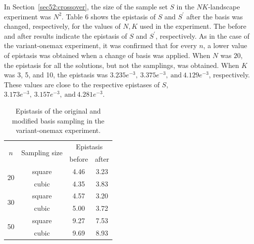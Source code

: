 In Section~\ref{sec52:crossover}, the size of the sample set $ S $ in the $ NK $-landscape experiment was $ N^2 $. Table 6 shows the epistasis of $ S $ and $ S^\prime $ after the basis was changed, respectively, for the values of $ N,K $ used in the experiment. The before and after results indicate the epistasis of $ S $ and $ S^\prime $, respectively. As in the case of the variant-onemax experiment, it was confirmed that for every $ n $, a lower value of epistasis was obtained when a change of basis was applied. When $ N $ was $ 20 $, the epistasis for all the solutions, but not the samplings, was obtained. When $ K $ was 3, 5, and 10, the epistasis was $ 3.235e^{-3},\ 3.375e^{-3},\ \text{and}\ 4.129e^{-3} $, respectively. These values are close to the respective epistases of $ S $, $ 3.173e^{-3},\ 3.157e^{-3},\ \text{and}\ 4.281e^{-3} $.


\begin{table}[ht!]
	\caption{Epistasis of the original and modified basis sampling in the variant-onemax experiment.} \label{tab:epi_var}
	\vspace*{0.2cm}
	\centering
\begin{tabular}{cccc}
	\toprule
	\multirow{2}{*}{$ n $} & \multirow{2}{*}{Sampling size} & \multicolumn{2}{c}{Epistasis} \\	\cmidrule(lr){3-4}
	
	& & before & after \\
	\midrule
	\multirow{2}{*}{20} & square	& 4.46 & 3.23 \\
						& cubic		& 4.35 & 3.83 \\
	\midrule
	\multirow{2}{*}{30} & square	& 4.57 & 3.20 \\
						& cubic		& 5.00 & 3.72 \\
	\midrule
	\multirow{2}{*}{50} & square	& 9.27 & 7.53 \\
						& cubic		& 9.69 & 8.93 \\
	\bottomrule
\end{tabular}
\end{table}

